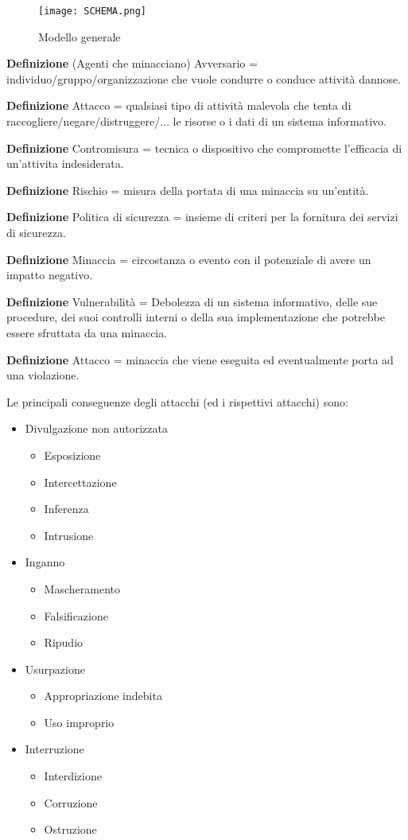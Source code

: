 \documentclass{article}
\newcommand{\df}[1]{\noindent\textbf{Definizione } #1.\newline}
\begin{document}
\begin{figure}[ht]
    \centering
    \texttt{[image: SCHEMA.png]}
    \caption{Modello generale}
\end{figure}

\df{(Agenti che minacciano) Avversario = individuo/gruppo/organizzazione che vuole condurre o conduce attività dannose}

\df{Attacco = qualsiasi tipo di attività malevola che tenta di raccogliere/negare/distruggere/$\ldots$ le risorse o i dati di un sistema informativo}

\df{Contromisura = tecnica o dispositivo che compromette l'efficacia di un'attivita indesiderata}

\df{Rischio = misura della portata di una minaccia su un'entità}

\df{Politica di sicurezza = insieme di criteri per la fornitura dei servizi di sicurezza}

\df{Minaccia = circostanza o evento con il potenziale di avere un impatto negativo}

\df{Vulnerabilità = Debolezza di un sistema informativo, delle sue procedure, dei suoi controlli interni o della sua implementazione che potrebbe essere sfruttata da una minaccia}

\df{Attacco = minaccia che viene eseguita ed eventualmente porta ad una violazione}

\noindent Le principali conseguenze degli attacchi (ed i rispettivi attacchi) sono:
\begin{itemize}
    \item Divulgazione non autorizzata
        \begin{itemize}
            \item Esposizione
            \item Intercettazione
            \item Inferenza
            \item Intrusione
        \end{itemize}
    \item Inganno
        \begin{itemize}
            \item Mascheramento
            \item Falsificazione
            \item Ripudio
        \end{itemize}
    \item Usurpazione
        \begin{itemize}
            \item Appropriazione indebita
            \item Uso improprio
        \end{itemize}
    \item Interruzione
        \begin{itemize}
            \item Interdizione
            \item Corruzione
            \item Ostruzione
        \end{itemize}
\end{itemize}
\end{document}
